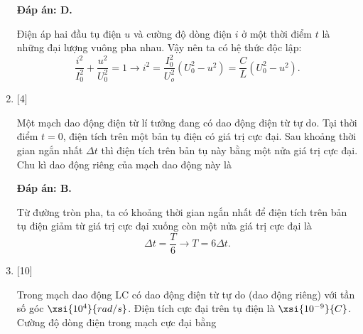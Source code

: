 \begin{enumerate}[label=\bfseries Câu \arabic*:]
	\loigiai
	{		\textbf{Đáp án: D.}
		
Điện áp hai đầu tụ điện $u$ và cường độ dòng điện $i$ ở một thời điểm $t$ là những đại lượng vuông pha nhau. Vậy nên ta có hệ thức độc lập:
$$
\dfrac{i^{2}}{I_{0}^{2}}+\dfrac{u^{2}}{U_{0}^{2}}=1 \rightarrow i^{2}=\dfrac{I_{0}^{2}}{U_{o}^{2}}\left(U_{0}^{2}-u^{2}\right)=\dfrac{C}{L}\left(U_{0}^{2}-u^{2}\right).
$$
	}

	\item {} [4]
	
	\cauhoi
	{Một mạch dao động điện từ lí tưởng đang có dao động điện từ tự do. Tại thời điểm $t = 0$, điện tích trên một bản tụ điện có giá trị cực đại. Sau khoảng thời gian ngắn nhất $\Delta t$ thì điện tích trên bản tụ này bằng một nửa giá trị cực đại. Chu kì dao động riêng của mạch dao động này là
	}
	
	\loigiai
	{		\textbf{Đáp án: B.}
		
Từ đường tròn pha, ta có khoảng thời gian ngắn nhất để điện tích trên bản tụ điện giảm từ giá trị cực đại xuống còn một nửa giá trị cực đại là
$$
\Delta t=\dfrac{T}{6} \rightarrow T=6 \Delta t.
$$
		
	}

	\item {} [10]
	
	\cauhoi
	{Trong mạch dao động LC có dao động điện từ tự do (dao động riêng) với tần số góc $\xsi{10^{4}}{rad/s}$. Điện tích cực đại trên tụ điện là $\xsi{10^{-9}}{C}$. Cường độ dòng điện trong mạch cực đại bằng
	}
	

\end{enumerate}
